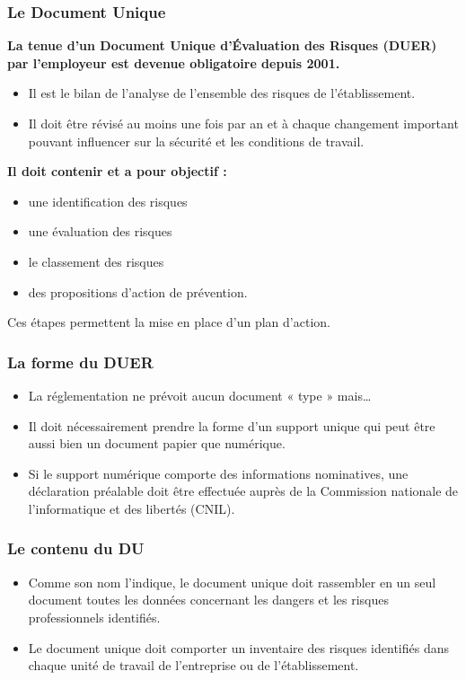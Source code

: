 \documentclass{beamer}
\begin{document}
\begin{frame}
\frametitle{Le Document Unique}

\textbf{La tenue d’un Document Unique d’Évaluation des Risques (DUER) par l’employeur est devenue obligatoire depuis 2001.}
\begin{itemize}
\item Il est le bilan de l’analyse de l’ensemble des risques de l’établissement. 

\item Il doit être révisé au moins une fois par an et à chaque changement important pouvant influencer sur la sécurité et les conditions de travail.
\end{itemize}

\textbf{Il doit contenir et a pour objectif :}
\begin{itemize}
\item une identification des risques
\item une évaluation des risques
\item le classement des risques
\item des propositions d’action de prévention.
\end{itemize}
Ces étapes permettent la mise en place d’un plan d’action.
\end{frame}

\begin{frame}
\frametitle{La forme du DUER}

\begin{itemize}
\item La réglementation ne prévoit aucun document « type » mais…
\item Il doit nécessairement prendre la forme d’un support unique qui peut être aussi bien un document papier que numérique. 
\item Si le support numérique comporte des informations nominatives, une déclaration préalable doit être effectuée auprès de la Commission nationale de l’informatique et des libertés (CNIL). 
\end{itemize}
\end{frame}

\begin{frame}
\frametitle{Le contenu du DU}

\begin{itemize}
\item Comme son nom l’indique, le document unique doit rassembler en un seul document toutes les données concernant les dangers et les risques professionnels identifiés.

\item Le document unique doit comporter un inventaire des risques identifiés dans chaque unité de travail de l’entreprise ou de l’établissement.  

\end{itemize}
\end{frame}
\end{document}
